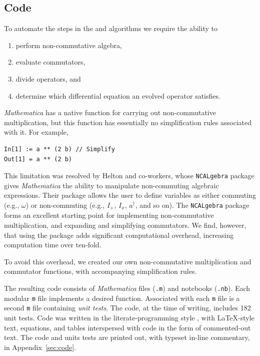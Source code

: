 \subsection{Code} 
\label{sec:code-subsection}

To automate the steps in the  and  algorithms we require the ability to
\begin{enumerate}
  \item perform non-commutative algebra, 
  \item evaluate commutators,
  \item divide operators, and 
  \item determine which differential equation an evolved operator satisfies.
\end{enumerate}
\emph{Mathematica} has a native function for carrying out non-commutative multiplication, but this function has essentially no simplification rules associated with it.
For example,
\begin{Verbatim}[xleftmargin=0.25in]
In[1] := a ** (2 b) // Simplify
Out[1] = a ** (2 b)
\end{Verbatim}
This limitation was resolved by Helton and co-workers, whose \verb+NCALgebra+ package \cite{Helton2015feb} gives \emph{Mathematica} the ability to manipulate non-commuting algebraic expressions.
Their package allows the user to define variables as either commuting (e.g., $\omega$) or non-commuting (e.g., $I_+$, $I_x$, $a^{\dagger}$, and so on). 
The \verb+NCALgebra+ package forms an excellent starting point for implementing non-commutative multiplication, and expanding and simplifying commutators. 
We find, however, that using the package adds significant computational overhead, increasing computation time over ten-fold.  

To avoid this overhead, we created our own non-commutative multiplication and commutator functions, with accompanying simplification rules.

The resulting code consists of  \emph{Mathematica} files (\verb+.m+) and notebooks (\verb+.nb+).
Each modular \verb+m+ file implements a desired function.
Associated with each \verb+m+ file is a second \verb+m+ file containing \emph{unit tests}.
The code, at the time of writing, includes 182 unit tests.
Code was written in the literate-programming style \cite{Knuth1984feb}, with \LaTeX{}-style text, equations, and tables interspersed with code in the form of commented-out text.
The code and units tests are printed out, with typeset in-line commentary, in Appendix~\ref{sec:code}. 

